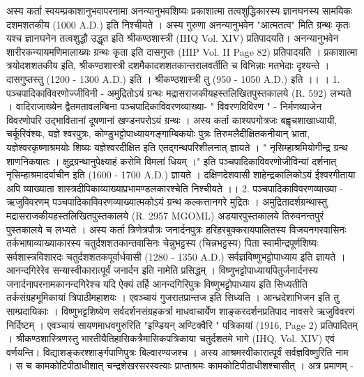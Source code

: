अस्य कर्ता स्वयम्प्रकाशानुभवापरनामा अनन्यानुभवशिष्यः प्रकाशात्मा तत्वशुद्धिकारस्य ज्ञानघनस्य सामयिकः दशमशतकीय (1000 A.D.) इति निश्चीयते । अस्य गुरुणा अनन्यानुभवेन "आत्मतत्व" मिति ग्रन्थः कृतः यश्च ज्ञानघनेन तत्वशुद्धौ उद्धृत इति श्रीकण्ठशास्त्री (IHQ Vol. XIV) प्रतिपादयति। अनन्यानुभवेन शारीरकन्यायमणिमालाख्यः ग्रन्थः कृता इति दासगुप्तः (HIP Vol. II Page 82) प्रतिपादयति । प्रकाशात्मा त्रयोदशशतकीय इति, श्रीकण्ठशास्त्री दशमैकादशशतकान्तरालवर्तीति च विभिन्नाः मतभेदाः दृश्यन्ते । दासगुप्तस्तु (1200 - 1300 A.D.) इति । श्रीकण्ठशास्त्री तु (950 - 1050 A.D.) इति ।। । 
1. पञ्चपादिकाविवरणोज्जीविनी - 
अमुद्रितोऽयं ग्रन्थः मद्रासराजकीयहस्तलिखितपुस्तकालये (R. 592) लभ्यते । वादिराजाख्येन द्वैतमतावलम्बिना पञ्चपादिकाविवरणव्याख्या- " विवरणविविरण " - निर्मणव्याजेन विवरणोपरि उद्भावितानां दूषणानां खण्डनपरोऽयं ग्रन्थः । अस्य कर्ता काश्यपगोत्रजः बह्वृचशाखाध्यायी, चर्कूरिवंश्यः, यज्ञे श्वरपुत्रः, कोण्डुभट्टोपाध्यायगङ्गाम्बिकयोः पुत्रः तिरुमलैदीक्षितकनीयान् भ्राता, यज्ञेश्वरकृष्णाश्रमयोः शिष्यः यज्ञेश्वरदीक्षित इति एतद्गन्थपरिशीलनात् ज्ञायते । " नृसिम्हाश्रमियोगीन्द्र ग्रन्थ शाणनिकषातः । क्षुद्रग्रन्थानुपेक्ष्याहं करोमि विमलां धियम् ।" इति पञ्चपादिकाविवरणोजीविन्यां  दर्शनात् नृसिम्हाश्रमादर्वाचीन इति (1600 - 1700 A.D.) ज्ञायते । दक्षिणदेशवासी शाहेन्द्रकालिकोऽयं ईश्वरगीताया अपि व्याख्याता शास्त्रदीपिकाव्याख्याप्रभामण्डलकारश्चेति निश्चीयते ।। 
2. पञ्चपादिकाविवरणव्याख्या - ऋजुविवरणम् 
पञ्चपादिकाविवरणव्याख्यात्मकोऽयं ग्रन्थ कल्कत्तानगरे मुद्रितः । अमुद्रितादर्शग्रन्थास्तु मद्रासराजकीयहस्तलिखितपुस्तकालये (R. 2957 MGOML) अडयारपुस्तकालये तिरुवनन्तपुरं पुस्तकालये च लभ्यते । अस्य कर्ता त्रिणेत्रपौत्रः जनार्दनपुत्रः हरिहरबुक्करायपालितस्य विजयनगरवासिनः तर्कभाषाव्याख्याकारस्य चतुर्दशशतकान्तवासिनः चेन्नुभट्टस्य (चिन्नभट्टस्य) पिता स्वामीन्द्रपूर्णशिष्यः सर्वशास्त्रविशारदः चतुर्दशशतकपूर्वार्धवासी (1280 - 1350 A.D.) सर्वज्ञविष्णुभट्टोपाध्याय इति ज्ञायते । 
आनन्दगिरेरेव सन्यास्वीकारात्पूर्वं जनार्दन इति नामेति प्रसिद्धम् । विष्णुभट्टोपाध्यायपितुर्जनार्दनस्य जनार्दनापरनामकानन्दगिरेश्च यदि ऐक्यं तर्हि आनन्दगिरिपुत्रः विष्णुभट्टोपाध्याय इति सिध्यतीति तर्कसंग्रहभूमिकायां त्रिपाठीमहाशयः । एवञ्चायं गुजरातप्रान्तज इति सिध्यति । आन्ध्रदेशाभिजन इति तु साम्प्रदायिकाः ।
विष्णुभट्टशिष्येण सर्वदर्शनसंग्रहकर्त्रा माधवाचार्येण शाङ्करदर्शनप्रतिपाद नावसरे ऋजुविवरणं निर्दिष्टम् । एवञ्चायं सायणमाधवगुरुरिति "इण्डियन् अण्टिक्वैरि " पत्रिकायां (1916, Page 2) प्रतिपादितम् ।
श्रीकण्ठशास्त्रिणस्तु भारतीयैतिहासिकत्रैमासिकपत्रिकाया चतुर्दशतमे भागे (IHQ. Vol. XIV) एवं वर्णयन्ति। 
विद्याशङ्करश्शार्ङ्गपाणिपुत्रः बिल्वारण्यजश्च । अस्य आश्रमस्वीकारात्पूर्वं सर्वज्ञविष्णुरिति नाम । स च  कामकोटिपीठाधीशात्  चन्द्रशेखरसरस्वत्याः प्राप्ताश्रमः कामकोटिपीठाधीशश्चासीत् । अत्र प्रमाणम् - 
